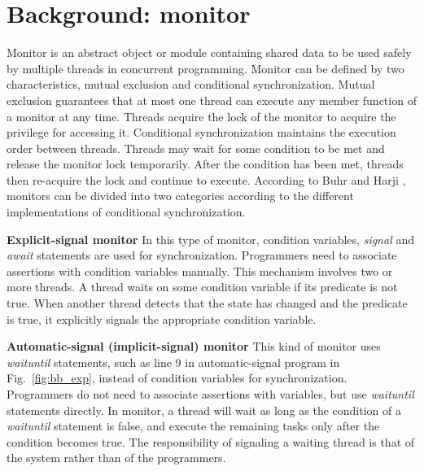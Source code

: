 \documentclass{sigplanconf}
\begin{document}
\section{Background: monitor} \label{sec:bg} 
Monitor is an abstract object or module containing shared data to be used safely
by multiple threads in concurrent programming. Monitor can
be defined by two characteristics, mutual exclusion and conditional 
synchronization. Mutual exclusion guarantees that at most one thread can 
execute any member function of a monitor at any time.  Threads  acquire the 
lock of the monitor to acquire the privilege for accessing it. Conditional synchronization 
maintains the execution order between threads. Threads may wait for some 
condition to be met and release the monitor lock temporarily. After the 
condition has been met, threads then re-acquire the lock and continue to 
execute. According to Buhr and Harji \cite{bh05}, monitors can be divided into 
two categories according to the different implementations of conditional 
synchronization. 
\begin{description}
    \item{\bf Explicit-signal monitor} In this type of monitor, condition
        variables, {\em signal} and {\em await} statements are used for synchronization. 
    Programmers need to associate assertions with condition variables manually.
    This mechanism involves two or more threads. A thread  waits on some condition variable 
    if its predicate is not true. When another thread detects that the state has 
    changed and the predicate is true, it explicitly signals the 
    appropriate condition variable.
    \item{\bf Automatic-signal (implicit-signal) monitor} This kind of monitor 
    uses {\em waituntil}
    statements, such as line 9 in automatic-signal program in
    Fig.~\ref{fig:bb_exp}, instead of condition variables for
    synchronization. Programmers do not need to associate assertions with
    variables, but use {\em waituntil} statements directly. In
    monitor, a thread will wait as long as the condition of a {\em waituntil}
    statement is false, and execute the remaining tasks only after the condition 
    becomes true. The responsibility of signaling a waiting thread is that of 
    the system rather than of the programmers. 
\end{description}
\end{document}
